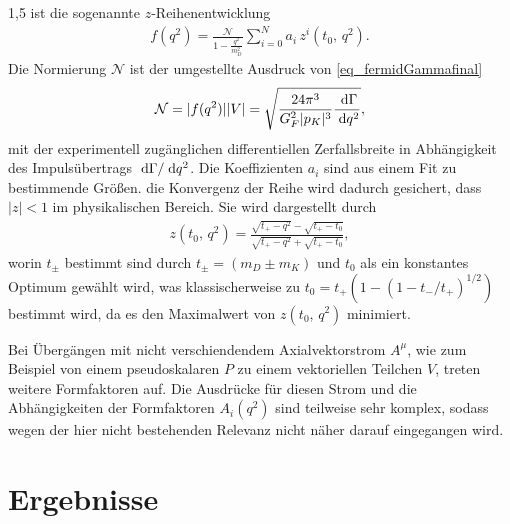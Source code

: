 \documentclass[11pt,a4paper,twoside]{report}
\begin{document}
\begin{spacing}{1,5}
ist die sogenannte $z$-Reihenentwicklung
\begin{align}
 f(q^2) = \frac{\mathcal{N}}{1-\frac{q^2}{m_D^2}} \sum\limits_{i=0}^N a_i\,z^i(t_0,\, q^2).
\end{align}
Die Normierung $\mathcal{N}$ ist der umgestellte Ausdruck von \eqref{eq_fermidGammafinal}
\begin{align}
 \mathcal{N} = |f(q^2)||V| =  \sqrt{\frac{24\pi^3}{G_F^2|p_K|^3}\frac{\; \mathrm{d} \Gamma}{\; \mathrm{d} q^2}},
\end{align}
mit der experimentell zugänglichen differentiellen Zerfallsbreite in Abhängigkeit des Impulsübertrags $\; \mathrm{d} \Gamma/\; \mathrm{d} q^2$. Die Koeffizienten $a_i$ sind
aus einem Fit zu bestimmende Größen. die Konvergenz der Reihe wird dadurch gesichert, dass $|z|<1$ im physikalischen Bereich. Sie wird dargestellt durch
\begin{align}
 z(t_0,\, q^2)= \frac{\sqrt{t_+-q^2}-\sqrt{t_+-t_0}}{\sqrt{t_+-q^2}+\sqrt{t_+-t_0}},
\end{align}
worin $t_\pm$ bestimmt sind durch $t_\pm = (m_D \pm m_K)$ und $t_0$ als ein konstantes Optimum gewählt wird, was klassischerweise zu 
$t_0 = t_+(1-(1-t_-/t_+)^{1/2})$ bestimmt wird, da es den Maximalwert von $z(t_0,\, q^2)$ minimiert.

Bei Übergängen mit nicht verschiendendem Axialvektorstrom $A^\mu$, wie zum Beispiel von einem pseudoskalaren $P$ zu einem vektoriellen Teilchen $V$, treten 
weitere Formfaktoren auf. Die Ausdrücke für diesen Strom und die Abhängigkeiten der Formfaktoren $A_i(q^2)$ sind teilweise sehr komplex, sodass wegen
der hier nicht bestehenden Relevanz nicht näher darauf eingegangen wird.

\chapter{Ergebnisse}

\end{spacing}
\end{document}
